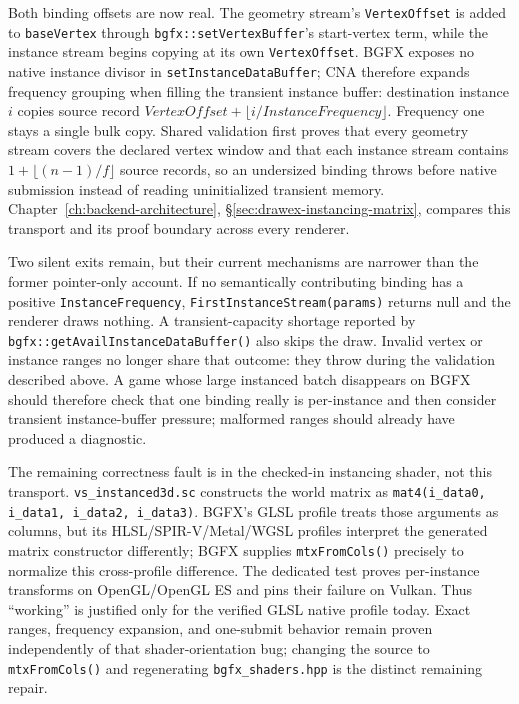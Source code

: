 Both binding offsets are now real. The geometry stream's \texttt{VertexOffset} is added to
\texttt{baseVertex} through \texttt{bgfx::setVertexBuffer}'s start-vertex term, while the
instance stream begins copying at its own \texttt{VertexOffset}. BGFX exposes no native
instance divisor in \texttt{setInstanceDataBuffer}; CNA therefore expands frequency grouping
when filling the transient instance buffer: destination instance $i$ copies source record
$\textit{VertexOffset}+\lfloor i/\textit{InstanceFrequency}\rfloor$. Frequency one stays a
single bulk copy. Shared validation first proves that every geometry stream covers the
declared vertex window and that each instance stream contains
$1+\lfloor(n-1)/f\rfloor$ source records, so an undersized binding throws before native
submission instead of reading uninitialized transient memory. Chapter~\ref{ch:backend-architecture},
\S\ref{sec:drawex-instancing-matrix}, compares this transport and its proof boundary across
every renderer.

Two silent exits remain, but their current mechanisms are narrower than the former
pointer-only account. If no semantically contributing binding has a positive
\texttt{InstanceFrequency}, \texttt{FirstInstanceStream(params)} returns null and the renderer
draws nothing. A transient-capacity shortage reported by
\texttt{bgfx::getAvailInstanceDataBuffer()} also skips the draw. Invalid vertex or instance
ranges no longer share that outcome: they throw during the validation described above. A game
whose large instanced batch disappears on BGFX should therefore check that one binding really
is per-instance and then consider transient instance-buffer pressure; malformed ranges should
already have produced a diagnostic.

The remaining correctness fault is in the checked-in instancing shader, not this transport.
\texttt{vs\_instanced3d.sc} constructs the world matrix as
\texttt{mat4(i\_data0, i\_data1, i\_data2, i\_data3)}. BGFX's GLSL profile treats those
arguments as columns, but its HLSL/SPIR-V/Metal/WGSL profiles interpret the generated matrix
constructor differently; BGFX supplies \texttt{mtxFromCols()} precisely to normalize this
cross-profile difference. The dedicated test proves per-instance transforms on OpenGL/OpenGL ES
and pins their failure on Vulkan. Thus ``working'' is justified only for the verified GLSL
native profile today. Exact ranges, frequency expansion, and one-submit behavior remain proven
independently of that shader-orientation bug; changing the source to \texttt{mtxFromCols()} and
regenerating \texttt{bgfx\_shaders.hpp} is the distinct remaining repair.

